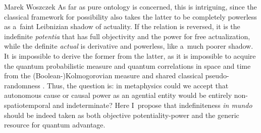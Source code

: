 \begin{artengenv}{Marek Woszczek}
As far as pure ontology is concerned, this is intriguing, since the classical framework for possibility also takes the latter to be completely powerless as a~faint Leibnizian shadow of actuality. If the relation is reversed, it is the indefinite \textit{potentia} that has full objectivity and the power for free actualization, while the definite \textit{actual} is derivative and powerless, like a~much poorer shadow. It is impossible to derive the former from the latter, as it is impossible to acquire the quantum probabilistic measure and quantum correlations in space and time from the (Boolean-)Kolmogorovian measure and shared classical pseudo-randomness
\parencite[][]{bub_quantum_2014}. %
 Thus, the question is: in metaphysics could we accept that autonomous cause or causal power as an agential entity would be entirely non-spatiotemporal and indeterminate? Here I~propose that indefiniteness \textit{in mundo} should be indeed taken as both objective potentiality-power and the generic resource for quantum advantage.

\end{artengenv}
